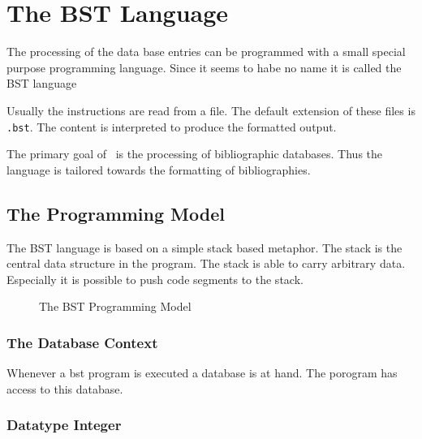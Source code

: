 
\chapter{The BST Language}

%
The processing of the data base entries can be programmed with a small
special purpose programming language. Since it seems to habe no name
it is called the BST language

Usually the instructions are read from a file. The default extension
of these files is \texttt{.bst}. The content is interpreted to produce
the formatted output.

The primary goal of \BibTeX\ is the processing of bibliographic
databases. Thus the language is tailored towards the formatting of
bibliographies.

\section{The Programming Model}

The BST language is based on a simple stack based metaphor. The stack
is the central data structure in the program. The stack is able to
carry arbitrary data. Especially it is possible to push code segments
to the stack.

\begin{figure}[tb]
  \centering
  
  \caption{The BST Programming Model}
  \label{fig:bst-model}
\end{figure}


\subsection{The Database Context}

Whenever a bst program is executed a database is at hand. The porogram
has access to this database.

\INCOMPLETE

\subsection{Datatype Integer}

